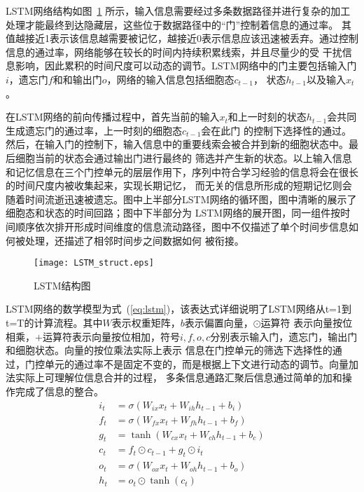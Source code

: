 LSTM网络结构如图~\ref{fig:lstm} 所示，输入信息需要经过多条数据路径并进行复杂的加工处理才能最终到达隐藏层，这些位于数据路径中的“门”控制着信息的通过率。
其值越接近1表示该信息越需要被记忆，越接近0表示信息应该迅速被丢弃。通过控制信息的通过率，网络能够在较长的时间内持续积累线索，并且尽量少的受
干扰信息影响，因此累积的时间尺度可以动态的调节。LSTM网络中的门主要包括输入门\(i\)，遗忘门\(f\)和和输出门\(o\)，网络的输入信息包括细胞态\(c_{t-1}\)，
状态\(h_{t-1}\)以及输入\(x_t\)。

在LSTM网络的前向传播过程中，首先当前的输入\(x_t\)和上一时刻的状态\(h_{t-1}\)会共同生成遗忘门的通过率，上一时刻的细胞态\(c_{t-1}\)会在此门
的控制下选择性的通过。然后，在输入门的控制下，输入信息中的重要线索会被合并到新的细胞状态中。最后细胞当前的状态会通过输出门进行最终的
筛选并产生新的状态。以上输入信息和记忆信息在三个门控单元的层层作用下，序列中符合学习经验的信息将会在很长的时间尺度内被收集起来，实现长期记忆，
而无关的信息所形成的短期记忆则会随着时间流逝迅速被遗忘。图中上半部分LSTM网络的循环图，图中清晰的展示了细胞态和状态的时间回路；图中下半部分为
LSTM网络的展开图，同一组件按时间顺序依次排开形成时间维度的信息流动路径，图中不仅描述了单个时间步信息如何被处理，还描述了相邻时间步之间数据如何
被衔接。

\begin{figure}
	\centering
	\texttt{[image: LSTM\_struct.eps]}
	\caption{LSTM结构图}
	\label{fig:lstm}
\end{figure}

LSTM网络的数学模型为式~(\ref{eq:lstm})，该表达式详细说明了LSTM网络从t=1到t=T的计算流程。其中\(W\)表示权重矩阵，\(b\)表示偏置向量，\(\odot\)运算符
表示向量按位相乘，\(+\)运算符表示向量按位相加，符号\(i,f,o,c\)分别表示输入门，遗忘门，输出门和细胞状态。向量的按位乘法实际上表示
信息在门控单元的筛选下选择性的通过，门控单元的通过率不是固定不变的，而是根据上下文进行动态的调节。向量加法实际上可理解位信息合并的过程，
多条信息通路汇聚后信息通过简单的加和操作完成了信息的整合。
\begin{equation}\label{eq:lstm}
	\begin{split}
		i_t &= \sigma(W_{ix} x_t + W_{ih} h_{t-1} + b_i)	\\
		f_t &= \sigma(W_{fx} x_t + W_{fh} h_{t-1} + b_f)	\\
		g_t &= \tanh(W_{cx} x_t + W_{ch} h_{t-1} + b_c)					\\
		c_t &= f_t \odot c_{t-1} + g_t \odot i_t							\\	
		o_t &= \sigma(W_{ox} x_{t} + W_{oh} h_{t-1} + b_o)	\\
		h_t &= o_t \odot \tanh(c_{t})											\\												
	\end{split}
\end{equation}


